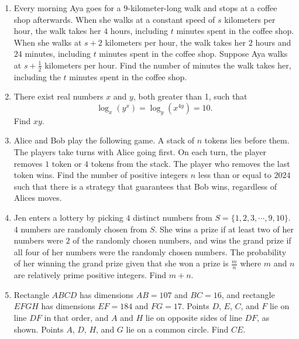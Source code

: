 \documentclass{article}
\begin{document}
\begin{enumerate}[label=\arabic*., itemsep=0.5em]
\item Every morning Aya goes for a \(9\)-kilometer-long walk and stops at a coffee shop afterwards. When she walks at a constant speed of \(s\) kilometers per hour, the walk takes her \(4\) hours, including \(t\) minutes spent in the coffee shop. When she walks at \(s + 2\) kilometers per hour, the walk takes her \(2\) hours and \(24\) minutes, including \(t\) minutes spent in the coffee shop. Suppose Aya walks at \(s + \frac{1}{2}\)
kilometers per hour. Find the number of minutes the walk takes her, including the \(t\) minutes spent in the coffee shop.\par \vspace{0.5em}\item There exist real numbers \(x\) and \(y\), both greater than 1, such that 
\begin{equation*}
\log_x(y^x) = \log_y(x^{4y}) = 10.
\end{equation*}
 Find \(xy\).\par \vspace{0.5em}\item Alice and Bob play the following game. A stack of \(n\) tokens lies before them. The players take turns with Alice going first. On each turn, the player removes \(1\) token or \(4\) tokens from the stack. The player who removes the last token wins. Find the number of positive integers \(n\) less than or equal to \(2024\) such that there is a strategy that guarantees that Bob wins, regardless of Alices moves.\par \vspace{0.5em}\item Jen enters a lottery by picking \(4\) distinct numbers from \(S=\{1,2,3,\cdots,9,10\}.\) \(4\) numbers are randomly chosen from \(S.\) She wins a prize if at least two of her numbers were \(2\) of the randomly chosen numbers, and wins the grand prize if all four of her numbers were the randomly chosen numbers. The probability of her winning the grand prize given that she won a prize is \(\tfrac{m}{n}\) where \(m\) and \(n\) are relatively prime positive integers. Find \(m+n\).\par \vspace{0.5em}\item Rectangle \(ABCD\) has dimensions \(AB = 107\) and \(BC = 16\), and rectangle \(EFGH\) has dimensions \(EF = 184\) and \(FG = 17\). Points \(D\), \(E\), \(C\), and \(F\) lie on line \(DF\) in that order, and \(A\) and \(H\) lie on opposite sides of line \(DF\), as shown. Points \(A\), \(D\), \(H\), and \(G\) lie on a common circle. Find \(CE\).



\end{enumerate}
\end{document}
